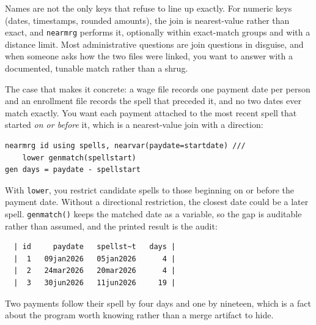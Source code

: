\documentclass[
    a4paper,
    fontsize=10pt,
    twoside=true,
    numbers=noenddot,
]{kaobook}
\begin{document}
Names are not the only keys that refuse to line up exactly. For numeric keys (dates, timestamps, rounded amounts), the join is nearest-value rather than exact, and \texttt{nearmrg} performs it, optionally within exact-match groups and with a distance limit. Most administrative questions are join questions in disguise, and when someone asks how the two files were linked, you want to answer with a documented, tunable match rather than a shrug.

The case that makes it concrete: a wage file records one payment date per person and an enrollment file records the spell that preceded it, and no two dates ever match exactly. You want each payment attached to the most recent spell that started \emph{on or before} it, which is a nearest-value join with a direction:
\par
{\footnotesize
\begin{verbatim}
nearmrg id using spells, nearvar(paydate=startdate) ///
    lower genmatch(spellstart)
gen days = paydate - spellstart
\end{verbatim}
}
With \texttt{lower}, you restrict candidate spells to those beginning on or before the payment date. Without a directional restriction, the closest date could be a later spell. \texttt{genmatch()} keeps the matched date as a variable, so the gap is auditable rather than assumed, and the printed result is the audit:
\par
{\footnotesize
\begin{verbatim}
  | id     paydate   spellst~t   days |
  |  1   09jan2026   05jan2026      4 |
  |  2   24mar2026   20mar2026      4 |
  |  3   30jun2026   11jun2026     19 |
\end{verbatim}
}
Two payments follow their spell by four days and one by nineteen, which is a fact about the program worth knowing rather than a merge artifact to hide.

\end{document}
